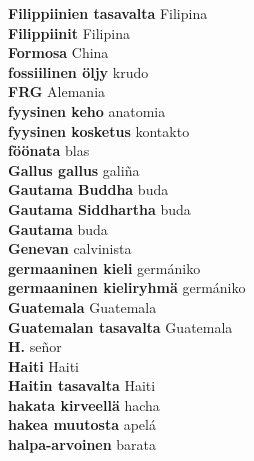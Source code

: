 \textbf{ Filippiinien tasavalta  } Filipina \\
\textbf{ Filippiinit  } Filipina \\
\textbf{ Formosa  } China \\
\textbf{ fossiilinen öljy  } krudo \\
\textbf{ FRG  } Alemania \\
\textbf{ fyysinen keho  } anatomia \\
\textbf{ fyysinen kosketus  } kontakto \\
\textbf{ föönata  } blas \\
\textbf{ Gallus gallus  } galiña \\
\textbf{ Gautama Buddha  } buda \\
\textbf{ Gautama Siddhartha  } buda \\
\textbf{ Gautama  } buda \\
\textbf{ Genevan  } calvinista \\
\textbf{ germaaninen kieli  } germániko \\
\textbf{ germaaninen kieliryhmä  } germániko \\
\textbf{ Guatemala  } Guatemala \\
\textbf{ Guatemalan tasavalta  } Guatemala \\
\textbf{ H.  } señor \\
\textbf{ Haiti  } Haiti \\
\textbf{ Haitin tasavalta  } Haiti \\
\textbf{ hakata kirveellä  } hacha \\
\textbf{ hakea muutosta  } apelá \\
\textbf{ halpa-arvoinen  } barata \\
